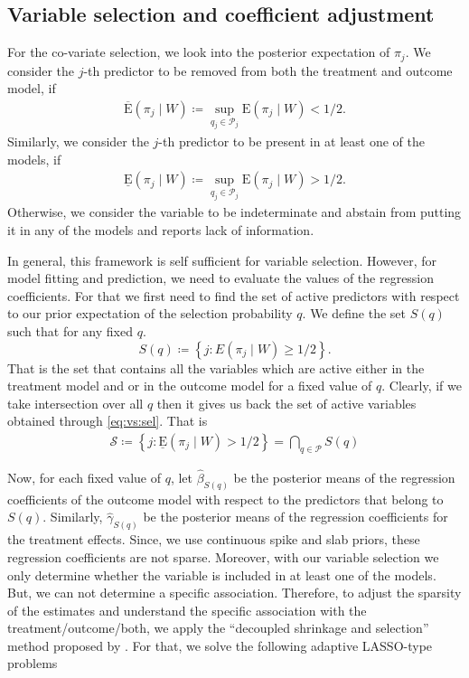 \documentclass[oribibl]{llncs}
\newcommand{\lexp}{\underline{\text{E}}}
\newcommand{\uexp}{\overline{\text{E}}}
\begin{document}
\subsection{Variable selection and coefficient adjustment}
For the co-variate selection, we look into the posterior expectation of $\pi_j$. 
We consider the $j$-th predictor to be removed from both the
treatment and outcome model, if
\begin{align}
	\uexp (\pi_j\mid W)\coloneqq \sup_{q_j\in \mathcal{P}_j} \text{E}(\pi_j\mid W) < 1/2.
\end{align}
Similarly, we consider the $j$-th predictor to be present in at least one of the models, if
\begin{align}\label{eq:vs:sel}
	\lexp (\pi_j\mid W)\coloneqq \sup_{q_j\in \mathcal{P}_j} \text{E}(\pi_j\mid W) > 1/2.
\end{align}
Otherwise, we consider the variable to be indeterminate and abstain from putting
it in any of the models and reports lack of information.

In general, this framework is self sufficient for variable selection. However, for
model fitting and prediction, we need to evaluate the values 
of the regression coefficients. For that we first need to find the set of active
predictors with respect to our prior expectation of the selection probability $q$.
We define the set $S(q)$ such that for any fixed $q$.
\begin{equation}
	S(q)\coloneqq
	\left\{j : E(\pi_j\mid W) \ge 1/2\right\}.
\end{equation}
That is the set that contains all the variables which are active
either in the treatment model and or in the outcome model for a fixed value of $q$. 
Clearly, if we take intersection over all $q$ then it gives us back the set of
active variables obtained through \cref{eq:vs:sel}. That is 
\begin{align}
    \mathcal{S}\coloneqq \left\{j:\lexp (\pi_j\mid W)>1/2\right\}
    = \bigcap_{q\in \mathcal{P}}S(q)
\end{align}

Now, for each fixed value of $q$, let $\hat{\beta}_{S(q)}$ be the posterior means 
of the regression coefficients of the outcome model with respect to
the predictors that belong to $S(q)$. Similarly,
$\hat{\gamma}_{S(q)}$ be the posterior means of the regression
coefficients for the treatment effects. Since, we use continuous 
spike and slab priors, these regression coefficients are not sparse.
Moreover, with our variable selection we only determine whether the variable 
is included in at least one of the models. But, we can not determine a specific 
association. Therefore, to adjust the sparsity of the estimates and understand
the specific association with the treatment/outcome/both, we apply the 
``decoupled shrinkage and selection'' method proposed by \cite{hahn2015}. 
For that, we solve the following adaptive LASSO-type \cite{Zou2006}
problems
\end{document}
